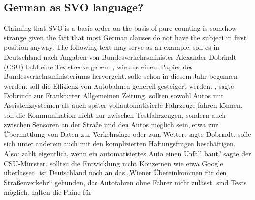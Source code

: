 

\subsection{German as SVO language?}

Claiming that SVO is a basic order on the basis of pure counting is somehow strange given the
fact that most German clauses do not have the subject in first position anyway. The following text
may serve as an example:
\eanoraggedright
{} soll es in Deutschland nach Angaben von Bundes\-ver\-kehrs\-mi\-nis\-ter
Alexander Dobrindt (CSU) bald eine Teststrecke geben.  , wie aus einem Papier des
Bundesverkehrsministeriums hervorgeht. 
solle schon in diesem Jahr begonnen werden.  soll die Effizienz von
Autobahnen generell gesteigert werden. , sagte Dobrindt zur Frankfurter
Allgemeinen Zeitung.   sollten sowohl Autos mit Assistenzsystemen als auch
später vollautomatisierte Fahrzeuge fahren können.  soll die Kommunikation nicht nur
zwischen Testfahrzeugen, sondern auch zwi\-schen Sensoren an der Straße und den Autos möglich sein,
etwa zur Übermittlung von Daten zur Verkehrslage oder zum Wetter.  sagte Dobrindt.  solle sich unter anderem auch mit den
komplizierten Haftungsfragen beschäftigen.  Also:  zahlt eigentlich, wenn ein
automatisiertes Auto einen Unfall baut?   sagte der
CSU-Minister.  sollten die Entwicklung nicht Konzernen wie etwa
Google überlassen.   ist Deutschland noch an das „Wiener Über\-ein\-kom\-men für den
Straßenverkehr“ gebunden, das Autofahren ohne Fahrer nicht zulässt.  sind Tests möglich.   halten die Pläne für
